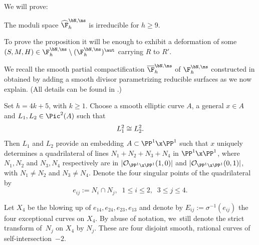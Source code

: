 We will prove:

\begin{prop} \label{prop:app}
The moduli space $\widehat{\F}_h^{\bN,\ns}$ is irreducible for $h \geq 9$.
\end{prop}

To prove the proposition it will be enough to exhibit a deformation of some $(S,M,H) \in \F_h^{\bN,\ns} \setminus (\F_h^{\bN,\ns})^\aut$ carrying $R$ to $R'$.

We recall the smooth partial compactification $\overline{\F}_h^{\bN,\ns}$ of $\F_h^{\bN,\ns}$ constructed in \cite[Cor.\,5.9]{KLV1} obtained by adding a smooth divisor parametrizing reducible surfaces as we now explain. (All details can be found in \cite[\S 5]{KLV1}.)

Set $h=4k+5$, with $k \geq 1$.
Choose a smooth elliptic curve $A$, a general $x \in A$ and $L_1, L_2 \in \Pic^2(A)$ such that
\begin{equation}\label{eins}L_1^{\*2} \cong L_2^{\*2}.\end{equation} Then $L_1$ and $L_2$ provide an embedding $A\subset\PP^1 \x \PP^1$ such that $x$ uniquely determines a quadrilateral of lines $N_1+N_2+N_3+N_4$ in $\PP^1 \x \PP^1$,
where $N_1, N_2$ and $N_3 , N_4$ respectively are in $\vert \mathcal O_{\PP^1 \x \PP^1}(1,0) \vert$ and $\vert \mathcal O_{\PP^1 \x \PP^1}(0, 1) \vert$, with $N_1 \neq N_2$ and $N_3 \neq N_4$.
Denote the four singular points of the quadrilateral by
\[
 e_{ij} := N_i \cap N_j, \;\; 1 \leq i \leq 2, \;\; 3 \leq j \leq 4.
\]

\begin{center}
\end{center}

Let $X_4$
be the blowing up of $e_{14},e_{24}, e_{23}, e_{13}$ and denote by
$E_{ij} := \sigma^{-1}(e_{ij})$ the four exceptional curves on $X_4$. By abuse of notation, we~still denote the strict transform of~$N_j$ on $X_4$ by $N_j$.
These are four disjoint smooth, rational curves of self-intersection~$-2$.

